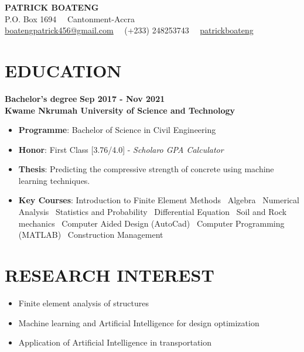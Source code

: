 \documentclass[letterpaper, 12pt]{article}
\newcommand{\cvsection}[1]{
	
	\section*{#1}
}
\newcommand{\verticalSpace}{4pt}
\begin{document}
	
	
	\begin{center}
		
	{\huge{\textbf{PATRICK BOATENG}}} \\ [\verticalSpace]
	
	P.O. Box 1694 \, \vrule \, Cantonment-Accra \\ [\verticalSpace]
	
	\faEnvelope \space \href{mailto:boatengpatrick456@gmail.com}{\underline{boatengpatrick456@gmail.com}}
	\, \vrule \,
	\faPhone \space (+233) 248253743
	\, \vrule \,
	 \faGithub \space \href{https://www.github.com/patrickboateng}{\underline{patrickboateng}}
	
	\end{center}
	
	
	\cvsection{EDUCATION} 	
	
	\textbf{Bachelor's degree} \hfill \textbf{Sep 2017 - Nov 2021} \\ [\verticalSpace]
	\textbf{Kwame Nkrumah University of Science and Technology}
	
	\begin{itemize}[leftmargin=*]
		
		\item \textbf{Programme}: Bachelor of Science in Civil Engineering
		\item \textbf{Honor}: First Class [3.76/4.0] - \textit{Scholaro GPA Calculator}
		\item \textbf{Thesis}: Predicting the compressive strength of concrete using machine learning techniques.
		\item \textbf{Key Courses}: Introduction to Finite Element Methods \vrule \, Algebra \vrule \, Numerical Analysis \vrule \, Statistics and Probability \vrule \, Differential Equation \vrule \, Soil and Rock mechanics \vrule \, Computer Aided Design (AutoCad) \vrule \, Computer Programming (MATLAB) \vrule \, Construction Management
	
	\end{itemize}
	
	
	\cvsection{RESEARCH INTEREST}
	
	\begin{itemize}[leftmargin=*]
		
		\item Finite element analysis of structures
		\item Machine learning and Artificial Intelligence for design optimization
		\item Application of Artificial Intelligence in transportation
		
	\end{itemize}
	
\end{document}
